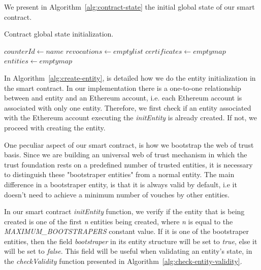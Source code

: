 We present in Algorithm~\ref{alg:contract-state} the initial global state of our smart contract.

\begin{algorithm}[h!]
  \caption{Contract global state initialization.}
  \label{alg:contract-state}
  \begin{algorithmic}
    \State $counterId \gets name$ 
    \State $revocations \gets empty list$ 
    \State $certificates \gets empty map$ 
    \State $entities \gets empty map$ 
  \end{algorithmic}
\end{algorithm}

In Algorithm~\ref{alg:create-entity}, is detailed how we do the entity initialization in the smart contract.
In our implementation there is a one-to-one relationship between and entity and an Ethereum account, i.e. each Ethereum account is associated with only one entity.
Therefore, we first check if an entity associated with the Ethereum account executing the \textit{initEntity} is already created.
If not, we proceed with creating the entity.

One peculiar aspect of our smart contract, is how we bootstrap the web of trust basis.
Since we are building an universal web of trust mechanism in which the trust foundation rests on a predefined number of trusted entities, it is necessary to distinguish these "bootstraper entities" from a normal entity.
The main difference in a bootstraper entity, is that it is always valid by default, i.e it doesn't need to achieve a minimum number of vouches by other entities.

In our smart contract \textit{initEntity} function, we verify if the entity that is being created is one of the first \textit{n} entities being created, where \textit{n} is equal to the \textit{MAXIMUM\_BOOTSTRAPERS} constant value.
If it is one of the bootstraper entities, then the field \textit{bootstraper} in its entity structure will be set to \textit{true}, else it will be set to \textit{false}.
This field will be useful when validating an entity's state, in the \textit{checkValidity} function presented in Algorithm~\ref{alg:check-entity-validity}.

